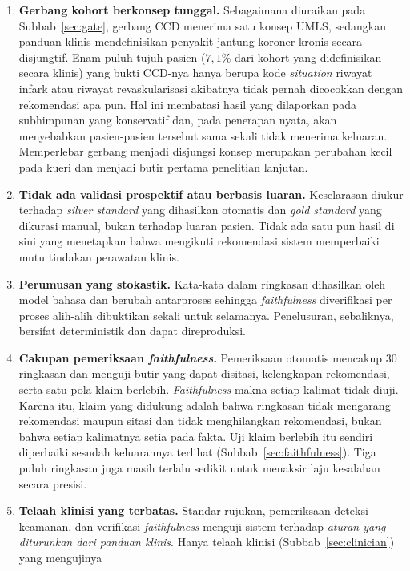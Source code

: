 \begin{enumerate}
    \item \textbf{Gerbang kohort berkonsep tunggal.} Sebagaimana diuraikan pada
    Subbab~\ref{sec:gate}, gerbang CCD menerima satu konsep UMLS, sedangkan panduan klinis
    mendefinisikan penyakit jantung koroner kronis secara disjungtif. Enam puluh tujuh pasien
    ($7{,}1\%$ dari kohort yang didefinisikan secara klinis) yang bukti CCD-nya hanya berupa
    kode \emph{situation} riwayat infark atau riwayat revaskularisasi akibatnya tidak pernah
    dicocokkan dengan rekomendasi apa pun. Hal ini membatasi hasil yang dilaporkan pada
    subhimpunan yang konservatif dan, pada penerapan nyata, akan menyebabkan pasien-pasien
    tersebut sama sekali tidak menerima keluaran. Memperlebar gerbang menjadi disjungsi konsep
    merupakan perubahan kecil pada kueri dan menjadi butir pertama penelitian lanjutan.
    \item \textbf{Tidak ada validasi prospektif atau berbasis luaran.} Keselarasan diukur
    terhadap \emph{silver standard} yang dihasilkan otomatis dan \emph{gold standard} yang
    dikurasi manual, bukan terhadap luaran pasien. Tidak ada satu pun hasil di sini yang
    menetapkan bahwa mengikuti rekomendasi sistem memperbaiki mutu tindakan perawatan klinis.
    \item \textbf{Perumusan yang stokastik.} Kata-kata dalam ringkasan dihasilkan oleh model
    bahasa dan berubah antarproses sehingga \emph{faithfulness} diverifikasi per proses
    alih-alih dibuktikan sekali untuk selamanya. Penelusuran, sebaliknya, bersifat
    deterministik dan dapat direproduksi.
    \item \textbf{Cakupan pemeriksaan \emph{faithfulness}.} Pemeriksaan otomatis mencakup 30
    ringkasan dan menguji butir yang dapat disitasi, kelengkapan rekomendasi, serta satu pola
    klaim berlebih. \emph{Faithfulness} makna setiap kalimat tidak diuji. Karena itu, klaim
    yang didukung adalah bahwa ringkasan tidak mengarang rekomendasi maupun sitasi dan tidak
    menghilangkan rekomendasi, bukan bahwa setiap kalimatnya setia pada fakta. Uji klaim
    berlebih itu sendiri diperbaiki sesudah keluarannya terlihat
    (Subbab~\ref{sec:faithfulness}). Tiga puluh ringkasan juga masih terlalu sedikit untuk
    menaksir laju kesalahan secara presisi.
    \item \textbf{Telaah klinisi yang terbatas.} Standar rujukan, pemeriksaan deteksi keamanan,
    dan verifikasi \emph{faithfulness} menguji sistem terhadap \emph{aturan yang diturunkan dari
    panduan klinis}. Hanya telaah klinisi (Subbab~\ref{sec:clinician}) yang mengujinya

\end{enumerate}
